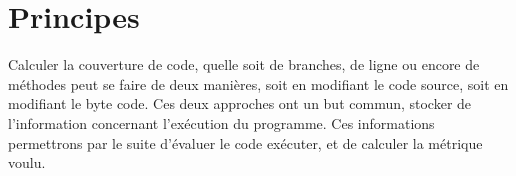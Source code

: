 \section{Principes}
\label{sec:principes}

Calculer la couverture de code, quelle soit de branches, de ligne ou encore de méthodes peut se faire de deux manières\cite{baxter}, soit en modifiant le code source, soit en modifiant le byte code. Ces deux approches ont un but commun, stocker de l’information concernant l’exécution du programme. Ces informations permettrons par le suite d’évaluer le code exécuter, et de calculer la métrique voulu.

